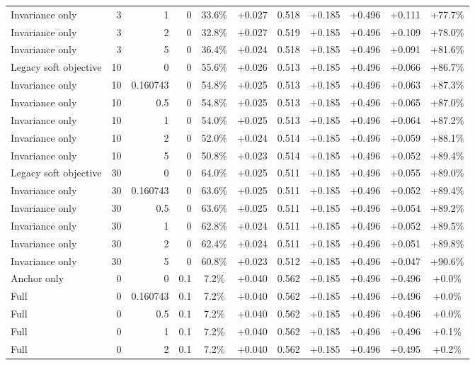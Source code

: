 \begin{table}[htbp]
\begin{tabular}{lrrrccccccc}
Invariance only & 3 & 1 & 0 & 33.6\% & +0.027 & 0.518 & +0.185 & +0.496 & +0.111 & +77.7\% \\
Invariance only & 3 & 2 & 0 & 32.8\% & +0.027 & 0.519 & +0.185 & +0.496 & +0.109 & +78.0\% \\
Invariance only & 3 & 5 & 0 & 36.4\% & +0.024 & 0.518 & +0.185 & +0.496 & +0.091 & +81.6\% \\
Legacy soft objective & 10 & 0 & 0 & 55.6\% & +0.026 & 0.513 & +0.185 & +0.496 & +0.066 & +86.7\% \\
Invariance only & 10 & 0.160743 & 0 & 54.8\% & +0.025 & 0.513 & +0.185 & +0.496 & +0.063 & +87.3\% \\
Invariance only & 10 & 0.5 & 0 & 54.8\% & +0.025 & 0.513 & +0.185 & +0.496 & +0.065 & +87.0\% \\
Invariance only & 10 & 1 & 0 & 54.0\% & +0.025 & 0.513 & +0.185 & +0.496 & +0.064 & +87.2\% \\
Invariance only & 10 & 2 & 0 & 52.0\% & +0.024 & 0.514 & +0.185 & +0.496 & +0.059 & +88.1\% \\
Invariance only & 10 & 5 & 0 & 50.8\% & +0.023 & 0.514 & +0.185 & +0.496 & +0.052 & +89.4\% \\
Legacy soft objective & 30 & 0 & 0 & 64.0\% & +0.025 & 0.511 & +0.185 & +0.496 & +0.055 & +89.0\% \\
Invariance only & 30 & 0.160743 & 0 & 63.6\% & +0.025 & 0.511 & +0.185 & +0.496 & +0.052 & +89.4\% \\
Invariance only & 30 & 0.5 & 0 & 63.6\% & +0.025 & 0.511 & +0.185 & +0.496 & +0.054 & +89.2\% \\
Invariance only & 30 & 1 & 0 & 62.8\% & +0.024 & 0.511 & +0.185 & +0.496 & +0.052 & +89.5\% \\
Invariance only & 30 & 2 & 0 & 62.4\% & +0.024 & 0.511 & +0.185 & +0.496 & +0.051 & +89.8\% \\
Invariance only & 30 & 5 & 0 & 60.8\% & +0.023 & 0.512 & +0.185 & +0.496 & +0.047 & +90.6\% \\
Anchor only & 0 & 0 & 0.1 & 7.2\% & +0.040 & 0.562 & +0.185 & +0.496 & +0.496 & +0.0\% \\
Full & 0 & 0.160743 & 0.1 & 7.2\% & +0.040 & 0.562 & +0.185 & +0.496 & +0.496 & +0.0\% \\
Full & 0 & 0.5 & 0.1 & 7.2\% & +0.040 & 0.562 & +0.185 & +0.496 & +0.496 & +0.0\% \\
Full & 0 & 1 & 0.1 & 7.2\% & +0.040 & 0.562 & +0.185 & +0.496 & +0.496 & +0.1\% \\
Full & 0 & 2 & 0.1 & 7.2\% & +0.040 & 0.562 & +0.185 & +0.496 & +0.495 & +0.2\% \\

\end{tabular}
\end{table}
